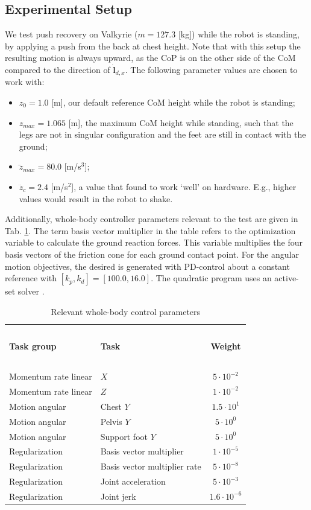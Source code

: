 \documentclass[letterpaper, 10 pt, conference]{ieeeconf}  %
\newcommand{\zmax}{z_{max}}
\begin{document}
\subsection{Experimental Setup}
We test push recovery on Valkyrie ($m=127.3$ [kg]) while the robot is standing, by applying a push from the back at chest height. Note that with this setup the resulting motion is always upward, as the CoP is on the other side of the CoM compared to the direction of $\dot{\mathbf{l}}_{d,x}$. The following parameter values are chosen to work with:
\begin{itemize}
\item $z_0=1.0$ [m], our default reference CoM height while the robot is standing;
\item $\zmax=1.065$ [m], the maximum CoM height while standing, such that the legs are not in singular configuration and the feet are still in contact with the ground;
\item $\dddot{z}_{max} = 80.0$ [m/s$^3$];
\item $\ddot{z}_c=2.4$ [m/s$^2$], a value that found to work `well' on hardware. E.g., higher values would result in the robot to shake. 
\end{itemize}

Additionally, whole-body controller parameters relevant to the test are given in Tab. \ref{tab:params}. The term basis vector multiplier in the table refers to the optimization variable to calculate the ground reaction forces. This variable multiplies the four basis vectors of the friction cone for each ground contact point. For the angular motion objectives, the desired is generated with PD-control about a constant reference with $[k_p, k_d]=[100.0,16.0]$. The quadratic program uses an active-set solver \cite{kuindersma2014efficiently}.
\begin{table}[h]
\caption{Relevant whole-body control parameters}
\label{tab:params}
\begin{center}
\begin{tabular}{llc}
\hline~\\[-2ex]
\textbf{Task group} & \textbf{Task} & \textbf{Weight}\\
\hline ~\\[-2ex]
Momentum rate linear& $X$ & $5 \cdot 10^{-2}$\\
Momentum rate linear& $Z$ & $1 \cdot 10^{-2}$\\
Motion angular& Chest $Y$ &    $1.5 \cdot 10^1$\\
Motion angular& Pelvis $Y$ &  $5 \cdot 10^0$\\
Motion angular& Support foot $Y$ &  $5 \cdot 10^0$\\
Regularization & Basis vector multiplier&  $1 \cdot 10^{-5}$\\
Regularization & Basis vector multiplier rate & $5 \cdot 10^{-8}$\\
Regularization & Joint acceleration & $5 \cdot 10^{-3}$\\
Regularization & Joint jerk & $1.6 \cdot 10^{-6}$\\
\hline
\end{tabular}
\end{center}
\end{table}
\end{document}
